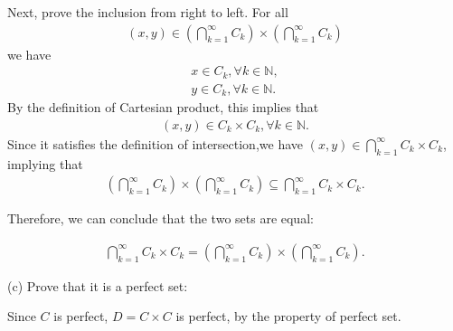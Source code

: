 \documentclass[UTF8,a4paper,10pt]{article}
\begin{document}
\begin{solution}
    Next, prove the inclusion from right to left. For all
    \begin{equation*}
      \begin{aligned}
          (x,y)\in \left(\bigcap_{k=1}^{\infty} C_k\right) \times \left(\bigcap_{k=1}^{\infty} C_k\right)
      \end{aligned}
    \end{equation*}
    we have
    \begin{equation*}
      \begin{aligned}
        x\in C_k, \forall k \in \mathbb{N},\\
        y\in C_k, \forall k \in \mathbb{N}.
      \end{aligned}
    \end{equation*}
    By the definition of Cartesian product, this implies that
    \begin{equation*}
      \begin{aligned}
        (x,y)\in C_k \times C_k, \forall k \in \mathbb{N}.
      \end{aligned}
    \end{equation*}
    Since it satisfies the definition of intersection,we have \((x,y)\in \bigcap_{k=1}^{\infty} C_k \times C_k \), implying that 
    \begin{equation*}
      \begin{aligned}
        \left(\bigcap_{k=1}^{\infty} C_k\right) \times \left(\bigcap_{k=1}^{\infty} C_k\right) \subseteq \bigcap_{k=1}^{\infty} C_k \times C_k .
      \end{aligned}
    \end{equation*}
    


    Therefore, we can conclude that the two sets are equal:

    \begin{equation*}
      \begin{aligned}
        \bigcap_{k=1}^{\infty} C_k \times C_k =  \left(\bigcap_{k=1}^{\infty} C_k\right) \times \left(\bigcap_{k=1}^{\infty} C_k\right) .
      \end{aligned}
    \end{equation*}

    (c) Prove that it is a perfect set:
    
    Since \(C\) is perfect, \(D=C\times C\) is perfect, by the property of perfect set.


 

  \end{solution}
  
\end{document}
